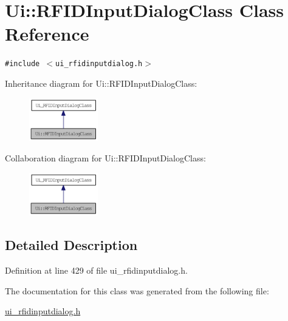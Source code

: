 \hypertarget{class_ui_1_1_r_f_i_d_input_dialog_class}{
\section{Ui::RFIDInputDialogClass Class Reference}
\label{class_ui_1_1_r_f_i_d_input_dialog_class}
}
{\tt \#include $<$ui\_\-rfidinputdialog.h$>$}

Inheritance diagram for Ui::RFIDInputDialogClass:\nopagebreak
\begin{figure}[H]
\begin{center}
\leavevmode
\includegraphics[width=85pt]{class_ui_1_1_r_f_i_d_input_dialog_class__inherit__graph}
\end{center}
\end{figure}
Collaboration diagram for Ui::RFIDInputDialogClass:\nopagebreak
\begin{figure}[H]
\begin{center}
\leavevmode
\includegraphics[width=85pt]{class_ui_1_1_r_f_i_d_input_dialog_class__coll__graph}
\end{center}
\end{figure}


\subsection{Detailed Description}


Definition at line 429 of file ui\_\-rfidinputdialog.h.

The documentation for this class was generated from the following file:\begin{CompactItemize}
\item 
\hyperlink{ui__rfidinputdialog_8h}{ui\_\-rfidinputdialog.h}\end{CompactItemize}

